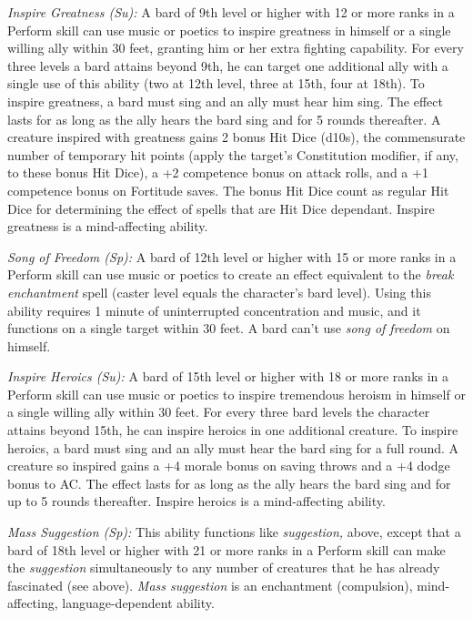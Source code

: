 \documentclass{article}
\begin{document}
\textit{Inspire Greatness (Su): }A bard of 9th level or higher with 12 or more 
ranks in a Perform skill can use music or poetics to inspire greatness in himself 
or a single willing ally within 30 feet, granting him or her extra fighting capability. 
For every three levels a bard attains beyond 9th, he can target one additional 
ally with a single use of this ability (two at 12th level, three at 15th, four 
at 18th). To inspire greatness, a bard must sing and an ally must hear him sing. 
The effect lasts for as long as the ally hears the bard sing and for 5 rounds thereafter. 
A creature inspired with greatness gains 2 bonus Hit Dice (d10s), the commensurate 
number of temporary hit points (apply the target's Constitution modifier, if any, 
to these bonus Hit Dice), a +2 competence bonus on attack rolls, and a +1 competence 
bonus on Fortitude saves. The bonus Hit Dice count as regular Hit Dice for determining 
the effect of spells that are Hit Dice dependant. Inspire greatness is a mind-affecting 
ability.

\textit{Song of Freedom (Sp): }A bard of 12th level or higher with 15 or more ranks 
in a Perform skill can use music or poetics to create an effect equivalent to the 
\textit{break enchantment }spell (caster level equals the character's bard level). 
Using this ability requires 1 minute of uninterrupted concentration and music, 
and it functions on a single target within 30 feet. A bard can't use \textit{song 
of freedom }on himself.

\textit{Inspire Heroics (Su): }A bard of 15th level or higher with 18 or more ranks 
in a Perform skill can use music or poetics to inspire tremendous heroism in himself 
or a single willing ally within 30 feet. For every three bard levels the character 
attains beyond 15th, he can inspire heroics in one additional creature. To inspire 
heroics, a bard must sing and an ally must hear the bard sing for a full round. 
A creature so inspired gains a +4 morale bonus on saving throws and a +4 dodge 
bonus to AC. The effect lasts for as long as the ally hears the bard sing and for 
up to 5 rounds thereafter. Inspire heroics is a mind-affecting ability.

\textit{Mass Suggestion (Sp): }This ability functions like \textit{suggestion, 
}above, except that a bard of 18th level or higher with 21 or more ranks in a Perform 
skill can make the \textit{suggestion }simultaneously to any number of creatures 
that he has already fascinated (see above). \textit{Mass suggestion }is an enchantment 
(compulsion), mind-affecting, language-dependent ability.
\end{document}
